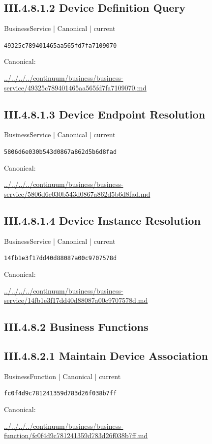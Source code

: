 \documentclass[10pt,a4paper]{article}
\begin{document}
\subsection*{III.4.8.1.2 Device Definition Query}
{\small BusinessService | Canonical | current}\par
\texttt{49325c789401465aa565fd7fa7109070}\par
Canonical: \par
{\footnotesize\url{../../../../continuum/business/business-service/49325c789401465aa565fd7fa7109070.md}}\par
\subsection*{III.4.8.1.3 Device Endpoint Resolution}
{\small BusinessService | Canonical | current}\par
\texttt{5806d6e030b543d0867a862d5b6d8fad}\par
Canonical: \par
{\footnotesize\url{../../../../continuum/business/business-service/5806d6e030b543d0867a862d5b6d8fad.md}}\par
\subsection*{III.4.8.1.4 Device Instance Resolution}
{\small BusinessService | Canonical | current}\par
\texttt{14fb1e3f17dd40d88087a00c9707578d}\par
Canonical: \par
{\footnotesize\url{../../../../continuum/business/business-service/14fb1e3f17dd40d88087a00c9707578d.md}}\par
\subsection*{III.4.8.2 Business Functions}
\subsection*{III.4.8.2.1 Maintain Device Association}
{\small BusinessFunction | Canonical | current}\par
\texttt{fc0f4d9c781241359d783d26f038b7ff}\par
Canonical: \par
{\footnotesize\url{../../../../continuum/business/business-function/fc0f4d9c781241359d783d26f038b7ff.md}}\par
\end{document}
